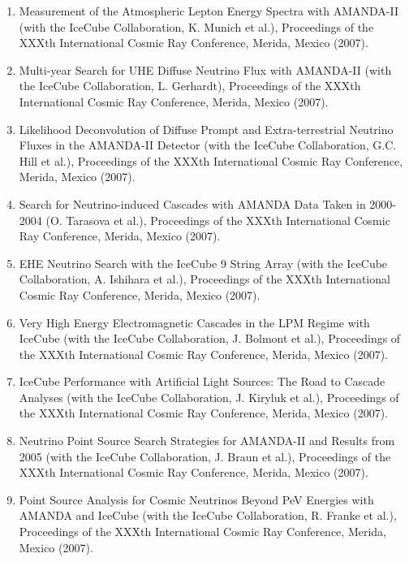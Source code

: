 \begin{enumerate}
\item Measurement of the Atmospheric Lepton Energy Spectra with
  AMANDA-II (with the IceCube Collaboration, K. Munich et al.),
  Proceedings of the XXXth International Cosmic Ray Conference,
  Merida, Mexico (2007).

\item Multi-year Search for UHE Diffuse Neutrino Flux with AMANDA-II
  (with the IceCube Collaboration, L. Gerhardt), Proceedings of the
  XXXth International Cosmic Ray Conference, Merida, Mexico (2007).

\item Likelihood Deconvolution of Diffuse Prompt and Extra-terrestrial
  Neutrino Fluxes in the AMANDA-II Detector (with the IceCube
  Collaboration, G.C. Hill et al.), Proceedings of the XXXth
  International Cosmic Ray Conference, Merida, Mexico (2007).

\item Search for Neutrino-induced Cascades with AMANDA Data Taken in
  2000-2004 (O. Tarasova et al.), Proceedings of the XXXth
  International Cosmic Ray Conference, Merida, Mexico (2007).

\item EHE Neutrino Search with the IceCube 9 String Array (with the
  IceCube Collaboration, A. Ishihara et al.), Proceedings of the XXXth
  International Cosmic Ray Conference, Merida, Mexico (2007).

\item Very High Energy Electromagnetic Cascades in the LPM Regime with
  IceCube (with the IceCube Collaboration, J. Bolmont et al.),
  Proceedings of the XXXth International Cosmic Ray Conference,
  Merida, Mexico (2007).

\item IceCube Performance with Artificial Light Sources: The Road to
  Cascade Analyses (with the IceCube Collaboration, J. Kiryluk et
  al.), Proceedings of the XXXth International Cosmic Ray Conference,
  Merida, Mexico (2007).

\item Neutrino Point Source Search Strategies for AMANDA-II and
  Results from 2005 (with the IceCube Collaboration, J. Braun et al.),
  Proceedings of the XXXth International Cosmic Ray Conference,
  Merida, Mexico (2007).

\item Point Source Analysis for Cosmic Neutrinos Beyond PeV Energies
  with AMANDA and IceCube (with the IceCube Collaboration, R. Franke
  et al.), Proceedings of the XXXth International Cosmic Ray
  Conference, Merida, Mexico (2007).


\end{enumerate}
